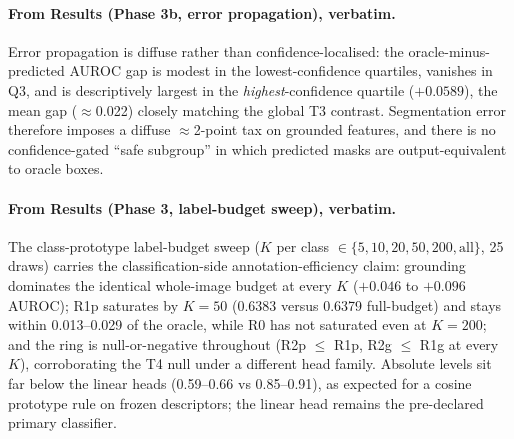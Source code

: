 \documentclass[11pt]{article}
\begin{document}
\paragraph{From Results (Phase 3b, error propagation), verbatim.}
Error propagation is diffuse rather than confidence-localised: the
oracle-minus-predicted AUROC gap is modest in the lowest-confidence
quartiles, vanishes in Q3, and is descriptively largest in the
\emph{highest}-confidence quartile ($+0.0589$), the mean gap
($\approx$0.022) closely matching the global T3 contrast. Segmentation
error therefore imposes a diffuse $\approx$2-point tax on grounded
features, and there is no confidence-gated ``safe subgroup'' in which
predicted masks are output-equivalent to oracle boxes.

\paragraph{From Results (Phase 3, label-budget sweep), verbatim.}
The class-prototype label-budget sweep ($K$ per class
$\in \{5,10,20,50,200,\mathrm{all}\}$, 25 draws) carries the
classification-side annotation-efficiency claim: grounding dominates the
identical whole-image budget at every $K$ ($+0.046$ to $+0.096$ AUROC);
R1p saturates by $K{=}50$ (0.6383 versus 0.6379 full-budget) and stays
within 0.013--0.029 of the oracle, while R0 has not saturated even at
$K{=}200$; and the ring is null-or-negative throughout (R2p $\leq$ R1p,
R2g $\leq$ R1g at every $K$), corroborating the T4 null under a
different head family. Absolute levels sit far below the linear heads
(0.59--0.66 vs 0.85--0.91), as expected for a cosine prototype rule on
frozen descriptors; the linear head remains the pre-declared primary
classifier.
\end{document}
